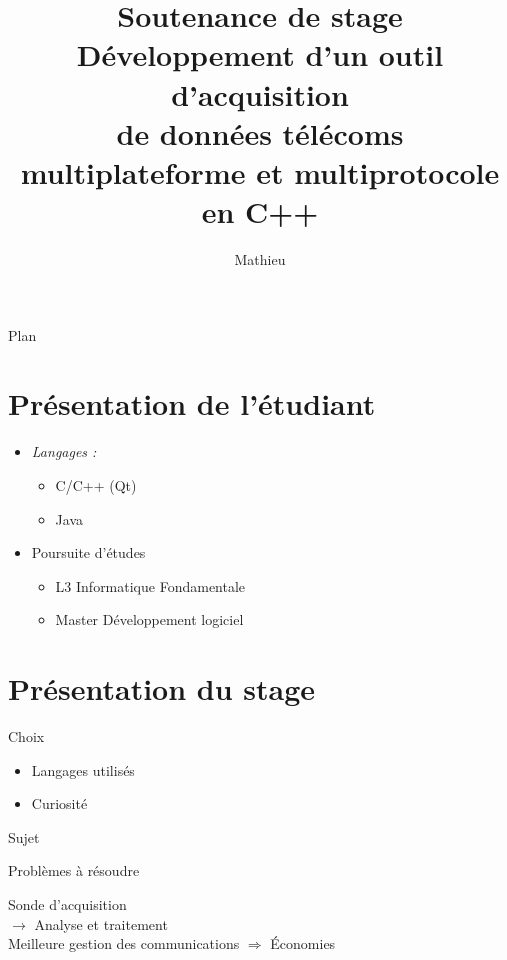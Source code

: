 \documentclass{beamer}
\title[Outils d'acquisition de donn\'es t\'el\'ecom en C++]
{ {\huge Soutenance de stage}\\
\vspace{10px}
D\'eveloppement d'un outil d'acquisition \\
de donn\'ees t\'el\'ecoms\\
multiplateforme et multiprotocole en C++}
\subtitle {}
\author[M. \bsc{Soum}]
{Mathieu \bsc{Soum}}
\institute[]
{
  IUT 'A' Toulouse -- Universit\'e Paul Sabatier \\
  DUT Informatique
  \vspace{-10px}
}
\date[\today{}]
{}
\begin{document}
\begin{frame}
  \titlepage
\end{frame}
\begin{frame}{Plan}
  \tableofcontents
\end{frame}

\section{Pr\'esentation de l'\'etudiant}
\begin{frame}
  \begin{itemize}
	\item \emph{Langages :}
	  \begin{itemize}
		\item C/C++ (Qt)\\ \pause
		\item Java\\ \pause
	  \end{itemize}
	\item Poursuite d'\'etudes
	  \begin{itemize}
		\item L3 Informatique Fondamentale\\ \pause 
		\item Master D\'eveloppement logiciel
	  \end{itemize}
  \end{itemize}
\end{frame}
\section{Pr\'esentation du stage}
\begin{frame}{Choix}
  \begin{itemize}
	\item Langages utilis\'es\\ \pause
	\item Curiosit\'e
  \end{itemize}
\end{frame}
\begin{frame}{Sujet}
  \begin{itemize}
  \end{itemize}
\end{frame}
\begin{frame}{Probl\`emes \`a r\'esoudre}
\begin{center}
Sonde d'acquisition\\\pause
$\rightarrow$ Analyse et traitement\\\pause
\vfill
\vfill
Meilleure gestion des communications \pause $\Rightarrow$ \'Economies
\vfill
\end{center}
\end{frame}
\end{document}
